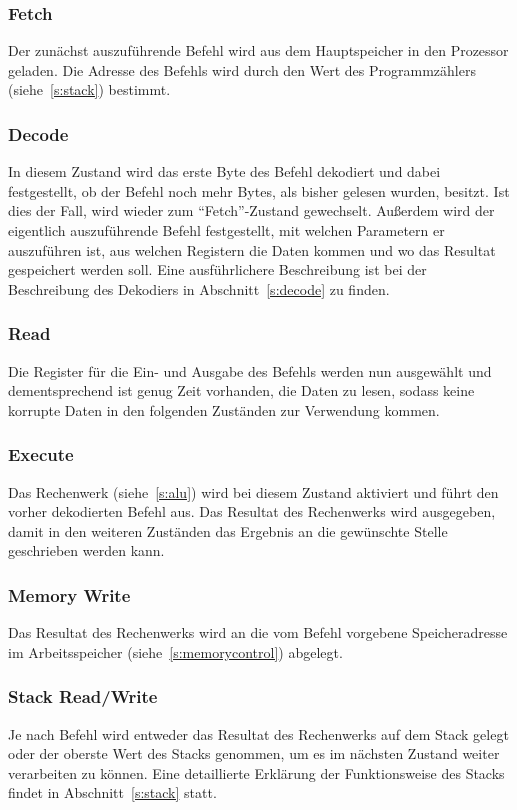 \subsubsection{Fetch}
Der zunächst auszuführende Befehl wird aus dem Hauptspeicher in den Prozessor
geladen. Die Adresse des Befehls wird durch den Wert des Programmzählers
(siehe~\ref{s:stack}) bestimmt.
\subsubsection{Decode}
In diesem Zustand wird das erste Byte des Befehl dekodiert und dabei
festgestellt, ob der Befehl noch mehr Bytes, als bisher gelesen wurden, besitzt.
Ist dies der Fall, wird wieder zum "`Fetch"'-Zustand gewechselt. Außerdem wird der
eigentlich auszuführende Befehl festgestellt, mit welchen Parametern er
auszuführen ist, aus welchen Registern die Daten kommen und wo das Resultat
gespeichert werden soll. Eine ausführlichere Beschreibung ist bei der
Beschreibung des Dekodiers in Abschnitt~\ref{s:decode} zu finden.
\subsubsection{Read}
Die Register für die Ein- und Ausgabe des Befehls werden nun ausgewählt und
dementsprechend ist genug Zeit vorhanden, die Daten zu lesen, sodass keine
korrupte Daten in den folgenden Zuständen zur Verwendung kommen.
\subsubsection{Execute}
Das Rechenwerk (siehe~\ref{s:alu}) wird bei diesem Zustand aktiviert und führt
den vorher dekodierten Befehl aus. Das Resultat des Rechenwerks wird ausgegeben,
damit in den weiteren Zuständen das Ergebnis an die gewünschte Stelle
geschrieben werden kann.
\subsubsection{Memory Write}
Das Resultat des Rechenwerks wird an die vom Befehl vorgebene Speicheradresse im
Arbeitsspeicher (siehe~\ref{s:memorycontrol}) abgelegt.
\subsubsection{Stack Read/Write}
Je nach Befehl wird entweder das Resultat des Rechenwerks auf dem Stack gelegt
oder der oberste Wert des Stacks genommen, um es im nächsten Zustand weiter
verarbeiten zu können. Eine detaillierte Erklärung der Funktionsweise des Stacks
findet in Abschnitt~\ref{s:stack} statt.
